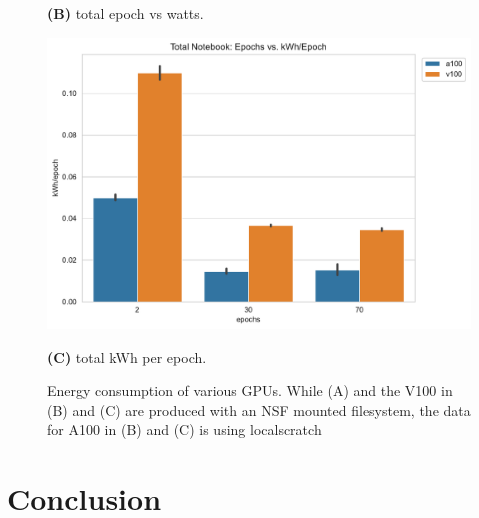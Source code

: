 \documentclass[utf8]{FrontiersinVancouver} %
\begin{document}
\begin{figure}[htb]
\begin{center}
        {\bf (B)} total epoch vs watts.

         \includegraphics[height=0.3\textheight]{images/total_kWh_per_epoch.pdf}

         {\bf (C)}  total kWh per epoch.

  \end{center}

  \caption{Energy consumption of various GPUs. While (A) and the V100
    in (B) and (C) are produced with an NSF mounted filesystem, the
    data for A100 in (B) and (C) is using localscratch} 
  \label{fig:energy-graphs-compare}
\end{figure}



\section{Conclusion}
\end{document}

